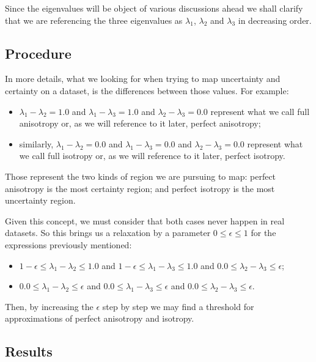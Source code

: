 \documentclass[a4paper,11pt]{report}
\begin{document}
    Since the eigenvalues will be object of various discussions ahead we shall clarify that we are referencing the three eigenvalues as $\lambda_1$, $\lambda_2$ and $\lambda_3$ in decreasing order.

    \subsection{Procedure}
    In more details, what we looking for when trying to map uncertainty and certainty on a dataset, is the differences between those values. For example:

    \begin{itemize}
      \item $\lambda_1 - \lambda_2 = 1.0$ and $\lambda_1 - \lambda_3 = 1.0$ and $\lambda_2 - \lambda_3 = 0.0$ represent what we call full anisotropy or, as we will reference to it later, perfect anisotropy;
      \item similarly, $\lambda_1 - \lambda_2 = 0.0$ and $\lambda_1 - \lambda_3 = 0.0$ and $\lambda_2 - \lambda_3 = 0.0$ represent what we call full isotropy or, as we will reference to it later, perfect isotropy.
    \end{itemize}

    Those represent the two kinds of region we are pursuing to map: perfect anisotropy is the most certainty region; and perfect isotropy is the most uncertainty region.

    Given this concept, we must consider that both cases never happen in real datasets. So this brings us a relaxation by a parameter $0 \leq \epsilon \leq 1$ for the expressions previously mentioned:

    \newpage
    \begin{itemize}
      \item $1 - \epsilon \leq \lambda_1 - \lambda_2 \leq 1.0$ and $1 - \epsilon \leq \lambda_1 - \lambda_3 \leq 1.0$ and $0.0 \leq \lambda_2 - \lambda_3 \leq \epsilon$;
      \item $0.0 \leq \lambda_1 - \lambda_2 \leq \epsilon$ and $0.0 \leq \lambda_1 - \lambda_3 \leq \epsilon$ and $0.0 \leq \lambda_2 - \lambda_3 \leq \epsilon$.
    \end{itemize}

    Then, by increasing the $\epsilon$ step by step we may find a threshold for approximations of perfect anisotropy and isotropy.

    \subsection{Results}
\end{document}
